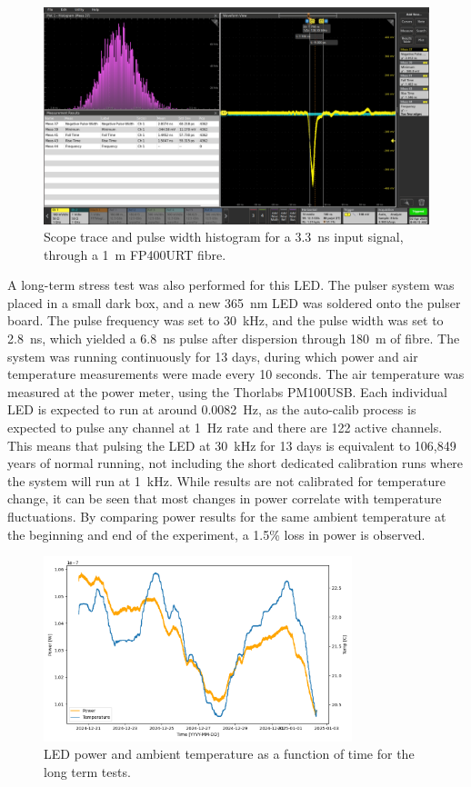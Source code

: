 \documentclass[a4paper,11pt]{article}
\begin{document}
\begin{figure}[h]
\centering
\includegraphics[width=\textwidth]{1LargePulse}
\caption{Scope trace and pulse width histogram for a 3.3~ns input signal, through a 1~m FP400URT fibre.}\label{fig:1LargePulse}
\end{figure}

A long-term stress test was also performed for this LED. The pulser system was placed in a small dark box, and a new 365~nm LED was soldered onto the pulser board. The pulse frequency was set to 30~kHz, and the pulse width was set to 2.8~ns, which yielded a 6.8~ns pulse after dispersion through 180~m of fibre. The system was running continuously for 13 days, during which power and air temperature measurements were made every 10 seconds. The air temperature was measured at the power meter, using the Thorlabs PM100USB. Each individual LED is expected to run at around 0.0082~Hz, as the auto-calib process is expected to pulse any channel at 1~Hz rate and there are 122 active channels. This means that pulsing the LED at 30~kHz for 13 days is equivalent to 106,849 years of normal running, not including the short dedicated calibration runs where the system will run at 1~kHz. While results are not calibrated for temperature change, it can be seen that most changes in power correlate with temperature fluctuations. By comparing power results for the same ambient temperature at the beginning and end of the experiment, a 1.5\% loss in power is observed.

\begin{figure}[h]
    \centering
    \includegraphics[width=0.8\textwidth]{PowerAndTempVsTime.png}
    \caption{LED power and ambient temperature as a function of time for the long term tests.}
    \label{fig:powertempvstime}
\end{figure}
\end{document}
